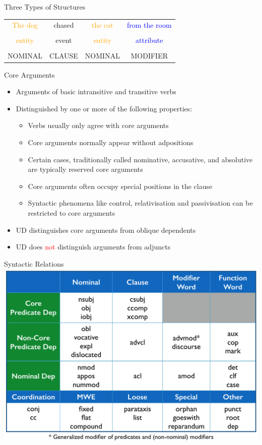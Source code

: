 \documentclass[10pt, compress, aspectratio=169]{beamer}
\begin{document}
\begin{frame}{Three Types of Structures}
\begin{tabular}{cccc}
\textcolor{orange}{The dog} & chased & \textcolor{orange}{the cat} & \textcolor{blue}{from the room}\\
& & & \\
\textcolor{orange}{entity}  & event & \textcolor{orange}{entity} & \textcolor{blue}{attribute}\\
& & & \\
NOMINAL & CLAUSE & NOMINAL & MODIFIER\\
\end{tabular}

\end{frame}

\begin{frame}{Core Arguments}
\begin{itemize}
\item Arguments of basic intransitive and transitive verbs
\item Distinguished by one or more of the following properties:
\begin{itemize}
\item Verbs usually only agree with core arguments
\item Core arguments normally appear without adpositions
\item Certain cases, traditionally called nominative, accusative, and absolutive are typically reserved core arguments
\item Core arguments often occupy special positions in the clause
\item Syntactic phenomena like control, relativisation and passivisation can be restricted to core arguments
\end{itemize}
\item UD distinguishes core arguments from oblique dependents
\item UD does \textcolor{red}{not} distinguish arguments from adjuncts
\end{itemize}
\end{frame}


\begin{frame}{Syntactic Relations}
\centering
\bigskip
\includegraphics[scale=0.33]{images/taxonomy.png}
\end{frame}
\end{document}
